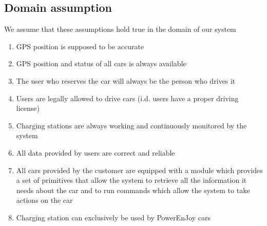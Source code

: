 \subsection{Domain assumption}
	We assume that these assumptions hold true in the domain of our system 
	\begin{enumerate}[label=\textbf{DA\arabic*}]
		\item GPS position is supposed to be accurate
		\item GPS position and status of all cars is always available
		\item The user who reserves the car will always be the person who drives it
		\item Users are legally allowed to drive cars (i.d. users have a proper driving license)
		\item Charging stations are always working and continuously monitored by the system
		\item All data provided by users are correct and reliable
		\item All cars provided by the customer are equipped with a module which provides a set of
		primitives that allow the system to retrieve all the information it needs about
		the car and to run commands which allow the system to take actions on the car
		\item Charging station can exclusively be used by PowerEnJoy cars 
	\end{enumerate}